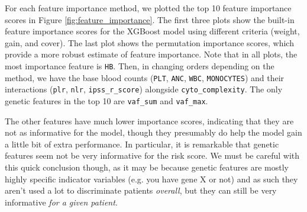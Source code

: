 \documentclass{article}
\begin{document}
For each feature importance method, we plotted the top 10 feature importance scores in Figure \ref{fig:feature_importance}. The first three plots show the built-in feature importance scores for the XGBoost model using different criteria (weight, gain, and cover). The last plot shows the permutation importance scores, which provide a more robust estimate of feature importance. Note that in all plots, the most importance feature is \texttt{HB}. Then, in changing orders depending on the method, we have the base blood counts (\texttt{PLT}, \texttt{ANC}, \texttt{WBC}, \texttt{MONOCYTES}) and their interactions (\texttt{plr}, \texttt{nlr}, \texttt{ipss\_r\_score}) alongside \texttt{cyto\_complexity}. The only genetic features in the top 10 are \texttt{vaf\_sum} and \texttt{vaf\_max}.

The other features have much lower importance scores, indicating that they are not as informative for the model, though they presumably do help the model gain a little bit of extra performance. In particular, it is remarkable that genetic features seem not be very informative for the risk score. We must be careful with this quick conclusion though, as it may be because genetic features are mostly highly specific indicator variables (e.g. you have gene X or not) and as such they aren't used a lot to discriminate patients \textit{overall}, but they can still be very informative \textit{for a given patient}.
\end{document}
